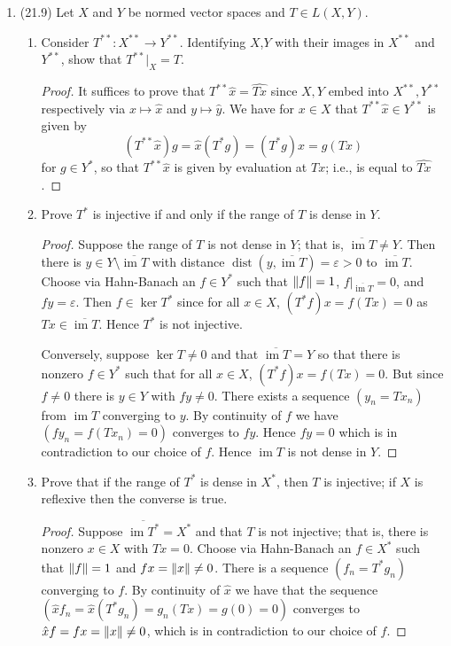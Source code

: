 \documentclass[11pt]{article}
\DeclareMathOperator{\im}{im}
\DeclareMathOperator{\dist}{dist}
\begin{document}
\begin{enumerate}
    \item (21.9) Let $X$ and $Y$ be normed vector spaces and $T\in L(X,Y)$. \begin{enumerate}
        \item Consider $T^{\ast\ast}\colon X^{\ast\ast}\to Y^{\ast\ast}$. Identifying $X$,$Y$ with their images in $X^{\ast\ast}$ and $Y^{\ast\ast}$,
        show that $T^{\ast\ast}|_X=T$. \begin{proof}
          It suffices to prove that $T^{\ast\ast}\hat{x} = \widehat{Tx}$ since $X,Y$ embed into $X^{\ast\ast},Y^{\ast\ast}$ respectively via $x\mapsto \hat{x}$ and $y\mapsto \hat{y}$. We have for $x\in X$ that $T^{\ast\ast}\hat{x}\in Y^{\ast\ast}$ is given by \[(T^{\ast\ast}\hat{x})g = \hat x( T^\ast g) = ( T^\ast g)x = g(Tx)\] for $g\in Y^\ast$, so that $T^{\ast\ast}\hat{x}$ is given by evaluation at $Tx$; i.e., is equal to $\widehat{Tx}$.
        \end{proof}
        \item Prove $T^\ast$ is injective if and only if the range of $T$ is dense in $Y$. \begin{proof}
          Suppose the range of $T$ is not dense in $Y$; that is, $\overline{\im T}\neq Y$. Then there is $y\in Y\setminus \overline{\im T}$ with  distance $\dist(y,\overline{\im T}) = \varepsilon>0$ to $\overline{\im T}$. Choose via Hahn-Banach an $f\in Y^\ast$ such that $\norm{f} = 1$, $f|_{\overline{\im T}} = 0$, and $fy = \varepsilon$. Then $f\in \ker T^\ast$ since for all $x\in X$, $(T^\ast f)x = f(Tx) = 0$ as $Tx\in \overline{\im T}$. Hence $T^\ast$ is not injective.

          Conversely, suppose $\ker T\neq 0$ and that $\overline{\im T} =Y$ so that there is nonzero $f\in Y^\ast$ such that for all $x\in X$, $(T^\ast f)x = f(Tx) = 0$. But since $f\neq 0$ there is $y\in Y$ with $fy\neq 0$. There exists a sequence $(y_n = Tx_n)$ from $\im T$ converging to $y$. By continuity of $f$ we have $(fy_n = f(Tx_n) = 0)$ converges to $fy$. Hence $fy = 0$ which is in contradiction to our choice of $f$. Hence $\im T$ is not dense in $Y$.
        \end{proof}
        \item Prove that if the range of $T^\ast$ is dense in $X^\ast$, then $T$ is injective; if $X$ is reflexive
        then the converse is true. \begin{proof}
          Suppose $\overline{\im T^\ast} = X^\ast$ and that $T$ is not injective; that is, there is nonzero $x\in X$ with $Tx = 0$. Choose via Hahn-Banach an $f\in X^\ast$ such that $\norm{f} = 1$ and $fx = \norm{x}\neq 0$. There is a sequence $(f_n = T^\ast g_n)$ converging to $f$. By continuity of $\hat{x}$ we have that the sequence $(\hat{x}f_n = \hat{x}(T^\ast g_n) = g_n(Tx) = g(0) = 0)$ converges to $\hat{x}f = fx = \norm{x}\neq 0$, which is in contradiction to our choice of $f$.


\end{proof}
\end{enumerate}
\end{enumerate}
\end{document}
